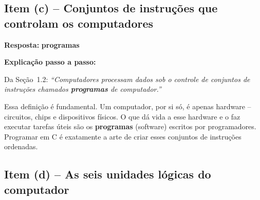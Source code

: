 \documentclass[12pt,a4paper]{article}
\begin{document}
\bigskip

\subsection*{Item (c) -- Conjuntos de instruções que controlam os computadores}

\begin{respostabox}
\textbf{Resposta:} \textcolor{deitelblue}{\textbf{programas}}

\medskip
\textbf{Explicação passo a passo:}

Da Seção~1.2: \textit{``Computadores processam dados sob o controle de conjuntos de
instruções chamados \textbf{programas} de computador.''}

Essa definição é fundamental. Um computador, por si só, é apenas hardware -- circuitos,
chips e dispositivos físicos. O que dá vida a esse hardware e o faz executar tarefas
úteis são os \textbf{programas} (software) escritos por programadores. Programar em C é
exatamente a arte de criar esses conjuntos de instruções ordenadas.
\end{respostabox}

\bigskip

\subsection*{Item (d) -- As seis unidades lógicas do computador}
\end{document}
